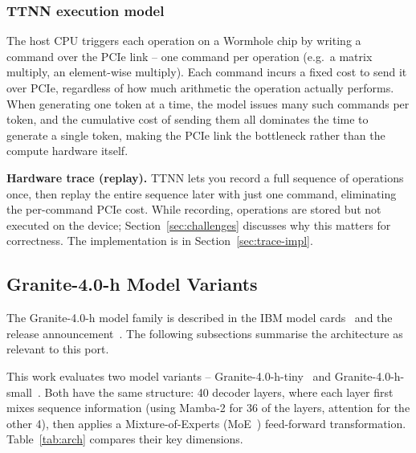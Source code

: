 \subsubsection{TTNN execution model}
\label{sec:exec-model}

The host CPU triggers each operation on a Wormhole chip by writing a command over the PCIe link -- one command per operation (e.g.\ a matrix multiply, an element-wise multiply). Each command incurs a fixed cost to send it over PCIe, regardless of how much arithmetic the operation actually performs. When generating one token at a time, the model issues many such commands per token, and the cumulative cost of sending them all dominates the time to generate a single token, making the PCIe link the bottleneck rather than the compute hardware itself.

\textbf{Hardware trace (replay).} TTNN lets you record a full sequence of operations once, then replay the entire sequence later with just one command, eliminating the per-command PCIe cost. While recording, operations are stored but not executed on the device; Section~\ref{sec:challenges} discusses why this matters for correctness. The implementation is in Section~\ref{sec:trace-impl}.

\subsection{Granite-4.0-h Model Variants}
\label{sec:granite-variants}

The Granite-4.0-h model family is described in the IBM model cards~\citep{ibmgranite2025tiny,ibmgranite2025small} and the release announcement~\citep{ibmgranite2025announcement}. The following subsections summarise the architecture as relevant to this port.

This work evaluates two model variants -- Granite-4.0-h-tiny~\citep{ibmgranite2025tiny} and Granite-4.0-h-small~\citep{ibmgranite2025small}. Both have the same structure: 40 decoder layers, where each layer first mixes sequence information (using Mamba-2 for 36 of the layers, attention for the other 4), then applies a Mixture-of-Experts (MoE~\citep{shazeer2017outrageously}) feed-forward transformation. Table~\ref{tab:arch} compares their key dimensions.


